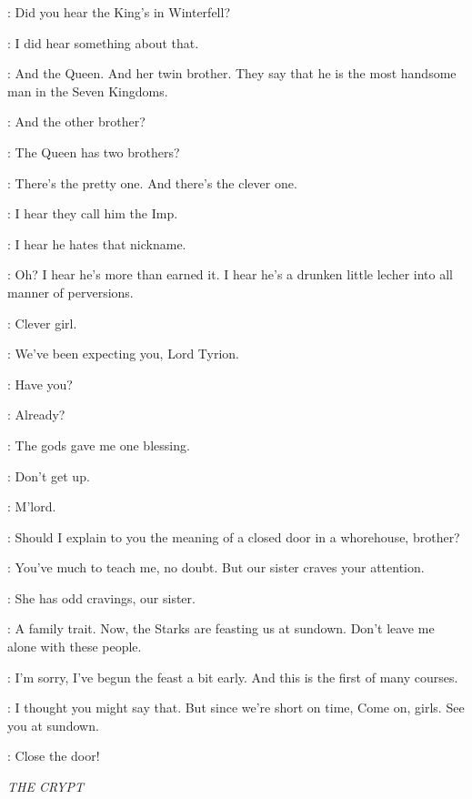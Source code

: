 \ROS: Did you hear the King's in Winterfell? 

\TYRION: I did hear something about that. 

\ROS: And the Queen. And her twin brother. They say that he is the most handsome man in the Seven Kingdoms. 

\TYRION: And the other brother? 

\ROS: The Queen has two brothers? 

\TYRION: There's the pretty one. And there's the clever one. 

\ROS: I hear they call him the Imp. 

\TYRION: I hear he hates that nickname. 

\ROS: Oh? I hear he's more than earned it. I hear he's a drunken little lecher into all manner of perversions. 

\TYRION: Clever girl. 

\ROS: We've been expecting you, Lord Tyrion. 

\TYRION: Have you? 

\ROS:  Already?

\TYRION: The gods gave me one blessing. 


\JAIME: Don't get up. 

\ROS: M'lord. 

\TYRION: Should I explain to you the meaning of a closed door in a whorehouse, brother? 

\JAIME: You've much to teach me, no doubt. But our sister craves your attention. 

\TYRION: She has odd cravings, our sister. 

\JAIME: A family trait. Now, the Starks are feasting us at sundown. Don't leave me alone with these people. 

\TYRION: I'm sorry, I've begun the feast a bit early. And this is the first of many courses. 

\JAIME: I thought you might say that. But since we're short on time,  Come on, girls. See you at sundown. 


\TYRION: Close the door! 


\scene

\textit{THE CRYPT} 


